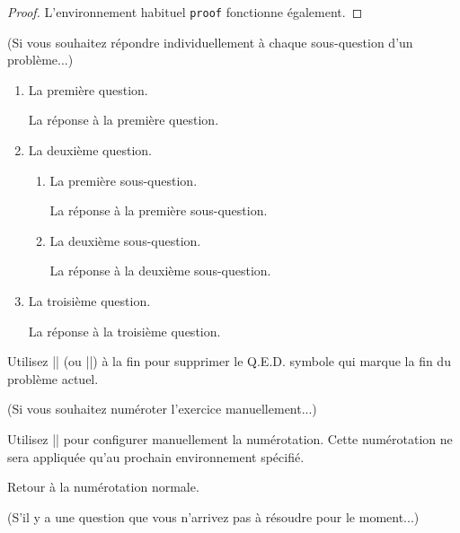 \documentclass[11pt,
  logo = {example-image},
  title in boldface,
  theorem in new line,
  colored solution,
]{homework}
\begin{document}
\begin{proof}
    L'environnement habituel \verb|proof| fonctionne également.
\end{proof}


\bigskip\textcolor{gray!55}{(Si vous souhaitez répondre individuellement à chaque sous-question d'un problème...)}

\begin{problem}
    \begin{enumerate}
        \item La première question.

        \begin{solution}
            La réponse à la première question.
        \end{solution}

        \item La deuxième question.

        \begin{enumerate}
            \item La première sous-question.

            \begin{solution}
                La réponse à la première sous-question.
            \end{solution}

            \item La deuxième sous-question.

            \begin{solution}
                La réponse à la deuxième sous-question.
            \end{solution}

        \end{enumerate}

        \item La troisième question.

        \begin{solution}
            La réponse à la troisième question.
        \end{solution}

    \end{enumerate}
    Utilisez \cverb|\noqed| (ou \cverb|\noQED|) à la fin pour supprimer le Q.E.D. symbole qui marque la fin du problème actuel.
    \noQED
\end{problem}


\bigskip\textcolor{gray!55}{(Si vous souhaitez numéroter l'exercice manuellement...)}

\begin{exercise}
    Utilisez \cverb|\ManualNumbering| pour configurer manuellement la numérotation. Cette numérotation ne sera appliquée qu'au prochain environnement spécifié.
\end{exercise}

\begin{exercise}
    Retour à la numérotation normale.
\end{exercise}


\bigskip\textcolor{gray!55}{(S'il y a une question que vous n'arrivez pas à résoudre pour le moment...)}

\end{document}
